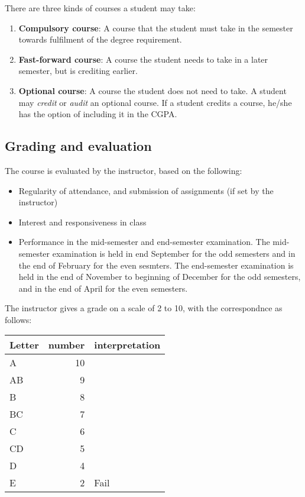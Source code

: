 \documentclass[a4paper]{amsart}
\begin{document}
There are three kinds of courses a student may take:

\begin{enumerate}

\item {\bf Compulsory course}: A course that the student must take in
  the semester towards fulfilment of the degree requirement.

\item {\bf Fast-forward course}: A course the student needs to take in a later semester, but is crediting earlier.

\item {\bf Optional course}: A course the student does not need to
  take. A student may {\em credit} or {\em audit} an optional course.
  If a student credits a course, he/she has the option of including it
  in the CGPA.

\end{enumerate}

\subsection{Grading and evaluation}

The course is evaluated by the instructor, based on the following:

\begin{itemize}

\item Regularity of attendance, and submission of assignments (if set
  by the instructor)

\item Interest and responsiveness in class

\item Performance in the mid-semester and end-semester examination.
  The mid-semester examination is held in end September for the odd
  semesters and in the end of February for the even sesmters. The
  end-semester examination is held in the end of November to beginning
  of December for the odd semesters, and in the end of April for the
  even semesters.

\end{itemize}

The instructor gives a grade on a scale of 2 to 10, with the
correspondnce as follows:

\begin{tabular}{|l|r|l|}
  \hline
  Letter & number & interpretation\\
  \hline
  A & 10 & \\
  AB & 9 & \\
  B & 8 & \\
  BC & 7 & \\
  C & 6 & \\
  CD & 5 & \\
  D & 4 & \\
  E & 2 & Fail\\
  \hline
\end{tabular}
\end{document}
